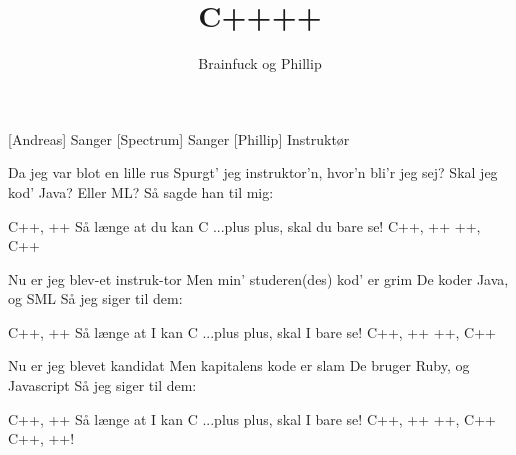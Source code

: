 \documentclass[a4paper,11pt]{article}
\title{C++++}
\author{Brainfuck og Phillip}
\begin{document}
\maketitle

\begin{roles}
[Andreas] Sanger
[Spectrum] Sanger
[Phillip] Instruktør
\end{roles}

\begin{song}
%

 Da jeg var blot en lille rus
Spurgt' jeg instruktor'n, hvor'n bli'r jeg sej?
Skal jeg kod' Java? Eller ML?
Så sagde han til mig:


 C++, ++
Så længe at du kan C
...plus plus, skal du bare se!
C++, ++
++, C++

 Nu er jeg blev-et instruk-tor
Men min' studeren(des) kod' er grim
 De koder Java, og SML
 Så jeg siger til dem:

 C++, ++
 Så længe at I kan C
 ...plus plus,
 skal I bare se!
 C++, ++
++, C++


 Nu er jeg blevet kandidat
Men kapitalens kode er slam
 De bruger Ruby, og Javascript
 Så jeg siger til dem:


 C++, ++
Så længe at I kan C
...plus plus, skal I bare se!
C++, ++
++, C++
C++, ++!

\end{song}
\end{document}
